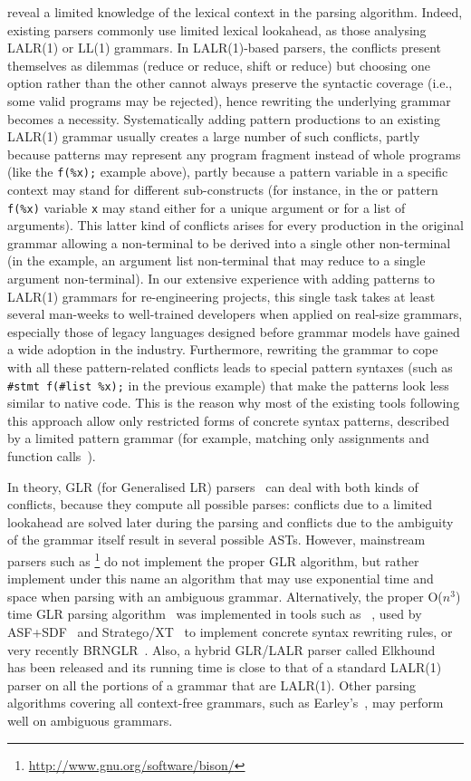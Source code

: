 reveal a limited knowledge of the lexical context in the parsing
algorithm. Indeed, existing parsers commonly use limited lexical
lookahead, as those analysing LALR(1) or LL(1) grammars. In
LALR(1)\hyp{}based parsers, the conflicts present themselves as
dilemmas (reduce or reduce, shift or reduce) but choosing one option
rather than the other cannot always preserve the syntactic coverage
(i.e., some valid programs may be rejected), hence rewriting the
underlying grammar becomes a necessity. Systematically adding pattern
productions to an existing LALR(1) grammar usually creates a large
number of such conflicts, partly because patterns may represent any
program fragment instead of whole programs (like the \texttt{f(\%x);}
example above), partly because a pattern variable in a specific
context may stand for different sub\hyp{}constructs (for instance, in
the \Clang or \Java pattern \texttt{f(\%x)} variable \texttt{x} may
stand either for a unique argument or for a list of arguments). This
latter kind of conflicts arises for every production in the original
grammar allowing a non\hyp{}terminal to be derived into a single other
non\hyp{}terminal (in the example, an argument list non\hyp{}terminal
that may reduce to a single argument non\hyp{}terminal). In our
extensive experience with adding patterns to LALR(1) grammars for
re\hyp{}engineering projects, this single task takes at least several
man\hyp{}weeks to well\hyp{}trained developers when applied on
real\hyp{}size grammars, especially those of legacy languages designed
before grammar models have gained a wide adoption in the
industry. Furthermore, rewriting the grammar to cope with all these
pattern\hyp{}related conflicts leads to special pattern syntaxes (such
as \texttt{\#stmt f(\#list \%x);} in the previous example) that make
the patterns look less similar to native code. This is the reason why
most of the existing tools following this approach allow only
restricted forms of concrete syntax patterns, described by a limited
pattern grammar (for example, matching only assignments and function
calls~\cite{blast-ql}).

In theory, GLR (for Generalised LR) parsers~\cite{glr} can deal with
both kinds of conflicts, because they compute all possible parses:
conflicts due to a limited lookahead are solved later during the
parsing and conflicts due to the ambiguity of the grammar itself
result in several possible ASTs. However, mainstream parsers such as
\Bison\footnote{\url{http://www.gnu.org/software/bison/}} do not
implement the proper GLR algorithm, but rather implement under this
name an algorithm that may use exponential time and space when parsing
with an ambiguous grammar. Alternatively, the proper O($n^3$) time GLR
parsing algorithm~\cite{glr} was implemented in tools such as
\SDF~\cite{sdf}, used by \textsf{ASF+SDF}~\cite{asf+sdf} and
\textsf{Stratego/XT}~\cite{metaprog} to implement concrete syntax
rewriting rules, or very recently BRNGLR~\cite{brnglr}. Also, a hybrid
GLR/LALR parser called \textsf{Elkhound}~\cite{elkhound} has been
released and its running time is close to that of a standard LALR(1)
parser on all the portions of a grammar that are LALR(1). Other
parsing algorithms covering all context\hyp{}free grammars, such as
Earley's~\cite{earley}, may perform well on ambiguous grammars.

